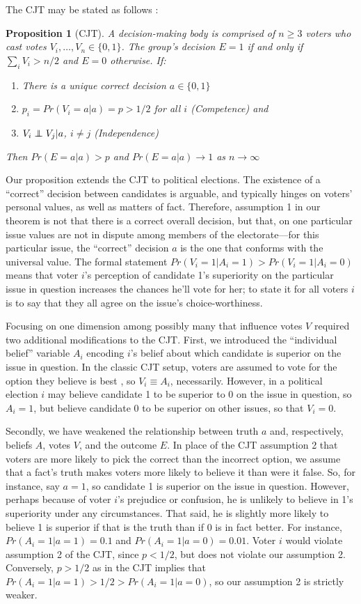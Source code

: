 \documentclass[11pt]{article}
\def\independenT#1#2{\mathrel{\rlap{$#1#2$}\mkern2mu{#1#2}}}
\newcommand\independent{\protect\mathpalette{\protect\independenT}{\perp}}
\newtheorem*{prop*}{Proposition}
\begin{document}
The CJT may be stated as follows \citep[e.g.][]{boland1989majority}:
\begin{prop*}[CJT]
A decision-making body is comprised of $n\ge 3$ voters who cast votes
$V_i,\dots,V_n\in \{0,1\}$. The group's decision $E= 1$ if and only if
$\sum_i V_i>n/2$ and $E=0$ otherwise.
If:
\begin{enumerate}
\item There is a unique correct decision $a\in \{0,1\}$
\item $p_i=Pr(V_i=a|a)=p>1/2$ for all $i$ (Competence) and
\item $V_i \independent V_j|a$, $i\ne j$ (Independence)
\end{enumerate}
Then $Pr(E=a|a)>p$ and $Pr(E=a|a)\rightarrow 1$ as
$n\rightarrow\infty$
\end{prop*}

Our proposition extends the CJT to political elections.
The existence of a ``correct'' decision
between candidates is arguable, and typically hinges on voters'
personal values, as well as matters of fact. 
Therefore, assumption 1 in our theorem is not that there is a correct
overall decision, but that, on one particular issue values are not in
dispute among members of the electorate---for this particular issue,
the ``correct'' decision $a$ is the one that conforms with the
universal value. 
The formal statement $Pr(V_i=1|A_i=1) > Pr(V_i=1|A_i=0)$ means
that voter $i$'s perception of candidate 1's superiority on the
particular issue in question increases the chances he'll vote for
her; to state it for all voters $i$ is to say that they all agree on
the issue's choice-worthiness. 

Focusing on one dimension among possibly many that influence votes $V$
required two additional modifications to the CJT.
First, we introduced the ``individual belief'' variable $A_i$ encoding
$i$'s belief about which candidate is superior on the issue in
question.
In the classic CJT setup, voters are assumed to vote for the option
they believe is best \citep[See][however]{austen1996information}, so
$V_i\equiv A_i$, necessarily. 
However, in a political election $i$ may believe candidate 1 to be
superior to 0 on the issue in question, so $A_i=1$, but believe
candidate 0 to be superior on other issues, so that $V_i=0$.

Secondly, we have weakened the relationship between truth $a$ and,
respectively, beliefs $A$, votes $V$, and the outcome $E$.
In place of the CJT assumption 2 that voters are more likely to pick
the correct than the incorrect option, we assume that a fact's truth
makes voters more likely to believe it than were it false.
So, for instance, say $a=1$, so candidate 1 is superior on the issue
in question. 
However, perhaps because of voter $i$'s prejudice or confusion, he is
unlikely to believe in 1's superiority under any circumstances.
That said, he is slightly more likely to believe 1 is superior if that
is the truth than if 0 is in fact better.
For instance, $Pr(A_i=1|a=1)=0.1$ and $Pr(A_i=1|a=0)=0.01$. 
Voter $i$ would violate assumption 2 of the CJT, since $p<1/2$, but
does not violate our assumption 2.
Conversely, $p>1/2$ as in the CJT implies that
$Pr(A_i=1|a=1)>1/2>Pr(A_i=1|a=0)$, so our assumption 2 is strictly
weaker.
\end{document}
